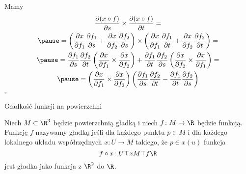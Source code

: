 \begin{frame}
Mamy
\begin{multline*}
\frac{\partial (x\circ f)}{\partial s}\times \frac{\partial (x\circ f)}{\partial t}=\\\pause
=\left(\frac{\partial x}{\partial f_1}\frac{\partial f_1}{\partial s}+\frac{\partial x}{\partial f_2}\frac{\partial f_2}{\partial s}\right)\times
\left(\frac{\partial x}{\partial f_1}\frac{\partial f_1}{\partial t}+\frac{\partial x}{\partial f_2}\frac{\partial f_2}{\partial t}\right)=\\ \pause
=\frac{\partial f_1}{\partial s}\frac{\partial f_2}{\partial t}\left(\frac{\partial x}{\partial f_1}\times \frac{\partial x}{\partial f_2}\right)+\frac{\partial f_1}{\partial t}\frac{\partial f_2}{\partial s}\left(\frac{\partial x}{\partial f_2}\times \frac{\partial x}{\partial f_1}\right)=\\\pause
=\left(\frac{\partial x}{\partial f_1}\times \frac{\partial x}{\partial f_2}\right)\left(\frac{\partial f_1}{\partial s}\frac{\partial f_2}{\partial t}-\frac{\partial f_1}{\partial t}\frac{\partial f_2}{\partial s}\right)
\end{multline*}
\hfill $\square$

\end{frame}
\begin{frame}{Gładkość funkcji na powierzchni}

\begin{definicja} \label{def:smooth_fun}
Niech $M\subset \R^3$ będzie powierzchnią gładką i niech $f\colon M\to \R$ będzie funkcją.
Funkcję $f$ nazywamy gładką jeśli dla każdego punktu $p\in M$ i dla każdego lokalnego układu współrzędnych $x\colon U\to M$ takiego, że $p\in x(u)$ funkcja \[f\circ x\colon U\top{x}M\top{f}\R\]
jest gładka jako funkcja z $\R^2$ do $\R$.
\end{definicja}

\end{frame}
